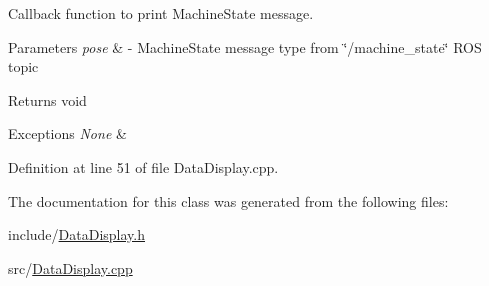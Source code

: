 Callback function to print Machine\+State message. 


\begin{DoxyParams}{Parameters}
{\em pose} & -\/ Machine\+State message type from \char`\"{}/machine\+\_\+state\char`\"{} R\+OS topic \\
\hline
\end{DoxyParams}
\begin{DoxyReturn}{Returns}
void 
\end{DoxyReturn}

\begin{DoxyExceptions}{Exceptions}
{\em None} & \\
\hline
\end{DoxyExceptions}


Definition at line 51 of file Data\+Display.\+cpp.



The documentation for this class was generated from the following files\+:\begin{DoxyCompactItemize}
\item 
include/\hyperlink{DataDisplay_8h}{Data\+Display.\+h}\item 
src/\hyperlink{DataDisplay_8cpp}{Data\+Display.\+cpp}\end{DoxyCompactItemize}
